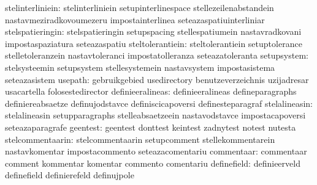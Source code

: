                stelinterliniein: stelinterliniein                 setupinterlinespace
                                  stellezeilenabstandein           nastavmeziradkovoumezeru
                                  impostainterlinea                seteazaspatiuinterliniar
                stelspatieringin: stelspatieringin                 setupspacing
                                  stellespatiumein                 nastavradkovani
                                  impostaspaziatura                seteazaspatiu
                steltolerantiein: steltolerantiein                 setuptolerance
                                  stelletoleranzein                nastavtoleranci
                                  impostatolleranza                seteazatoleranta
                     setupsystem: stelsysteemin                    setupsystem
                                  stellesystemein                  nastavsystem
                                  impostasistema                   seteazasistem
                         usepath: gebruikgebied                    usedirectory
                                  benutzeverzeichnis               uzijadresar %
                                  usacartella                      folosestedirector %
                definieeralineas: definieeralineas                 defineparagraphs
                                  definiereabsaetze                definujodstavce
                                  definiscicapoversi               definesteparagraf
                   stelalineasin: stelalineasin                    setupparagraphs
                                  stelleabsaetzeein                nastavodstavce
                                  impostacapoversi                 seteazaparagrafe
                        geentest: geentest                         donttest
                                  keintest                         zadnytest
                                  notest                           nutesta
                stelcommentaarin: stelcommentaarin                 setupcomment
                                  stellekommentarein               nastavkomentar
                                  impostacommento                  seteazacomentariu
                      commentaar: commentaar                       comment
                                  kommentar                        komentar
                                  commento                         comentariu
                     definefield: definieerveld                    definefield
                                  definierefeld                    definujpole
